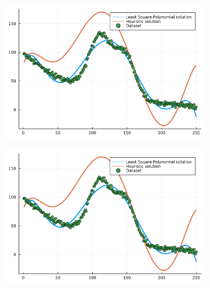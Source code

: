 \documentclass[12pt,a4paper]{article}
\begin{document}
\begin{figure}[H]
    \centering
    \begin{subfigure}{0.6\textwidth}
        \includegraphics[width=\linewidth]{../figs/methaeuristic_regression_result1F.png}
    \end{subfigure}
\end{figure}%
\begin{figure}[H]\ContinuedFloat
    \centering
    \begin{subfigure}{0.6\textwidth}
        \includegraphics[width=\linewidth]{../figs/methaeuristic_regression_result2F.png}
    \end{subfigure}
\end{figure}    
\end{document}
